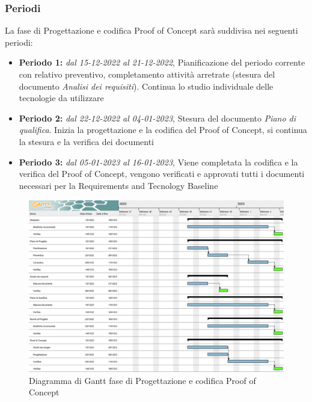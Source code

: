 \subsubsection{Periodi}
La fase di Progettazione e codifica Proof of Concept sarà suddivisa nei seguenti periodi:
\begin{itemize}
\item \textbf{Periodo 1:} \textit{dal 15-12-2022 al 21-12-2022}, Pianificazione del periodo corrente con relativo preventivo, completamento attività arretrate 
(stesura del documento \textit{Analisi dei requisiti}). Continua lo studio individuale delle tecnologie da utilizzare
\item \textbf{Periodo 2:} \textit{dal 22-12-2022 al 04-01-2023},  Stesura del documento \textit{Piano di qualifica}. Inizia la progettazione e la codifica del Proof of Concept, si continua la stesura e la verifica dei documenti
\item \textbf{Periodo 3:} \textit{dal 05-01-2023 al 16-01-2023}, Viene completata la codifica e la verifica del Proof of Concept, vengono verificati e approvati tutti i documenti necessari 
per la Requirements and Tecnology Baseline
\end{itemize}

\begin{figure}[H]
    \centering
    \includegraphics[scale=0.75]{image/gantt_poc.png}
    \caption{Diagramma di Gantt fase di Progettazione e codifica Proof of Concept}
\end{figure}
\pagebreak